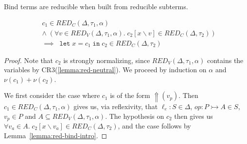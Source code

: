 \documentclass[acmsmall, screen, review, anonymous]{acmart}
\theoremstyle{definition}
\newcommand{\reflectname}{\mathord{\Uparrow}}
\newcommand{\performraw}[2]{\mathop{\reflectname(#1(#2))}}
\newcommand{\perform}[3]{\performraw{#1}{#2}(#3)}
\newcommand{\loc}{\ell}
\newcommand{\types}{\mathrel{:}}
\newcommand{\letvname}{\mathop{\mathtt{let}}}
\newcommand{\letv}[3]{\letvname #1 = #2 \mathop{\mathtt{in}} #3}
\newcommand{\sub}[2]{[#1\backslash#2]}
\newcommand{\sbst}[3]{#1\sub{#2}{#3}}
\newcommand{\bound}[1]{\nu(#1)}
\newcommand{\redname}{RED}
\newcommand{\redvname}{\redname_{V}}
\newcommand{\redva}[3]{\redvname{({#1},{#2},{#3})}}
\newcommand{\redcname}{\redname_{C}}
\newcommand{\redc}[2]{\redcname{({#1},{#2})}}
\newcommand{\redca}[3]{\redcname{({#1},{#2},{#3})}}
\begin{document}
Bind terms are reducible when built from reducible subterms.
\begin{lemma}
\label{lemma:red-bind}
\begin{align*}
  &c_1 \in \redca{\Delta}{\tau_1}{\alpha} \\
  &\wedge \; (\forall v \in \redva{\Delta}{\tau_1}{\alpha}. \; \sbst{c_2}{x}{v} \in \redc{\Delta}{\tau_2}) \\
  &\implies \; \letv{x}{c_1}{c_2} \in \redc{\Delta}{\tau_2}
\end{align*}
\end{lemma}
\begin{proof}
  Note that $c_2$ is strongly normalizing, since
  $\redva{\Delta}{\tau_1}{\alpha}$ contains the variables by
  CR3(\ref{lemma:red-neutral}). We proceed by induction on $\alpha$ and
  $\bound{c_1} + \bound{c_2}$.

  We first consider the case where $c_1$ is of the form
  $\perform{\loc_e}{op}{v_p}$. Then
  $c_1 \in \redca{\Delta}{\tau_1}{\alpha}$ gives us, via reflexivity,
  that $\loc_e \types S \in \Delta$,
  $op \types P \rightarrowtail A \in S$, $v_p \in P$ and
  $A \subseteq \redva{\Delta}{\tau_1}{\alpha}$. The hypothesis on $c_2$
  then gives us
  $\forall v_a \in A. \; \sbst{c_2}{x}{v_a} \in \redc{\Delta}{\tau_2}$,
  and the case follows by Lemma~\ref{lemma:red-bind-intro}.


\end{proof}
\end{document}
